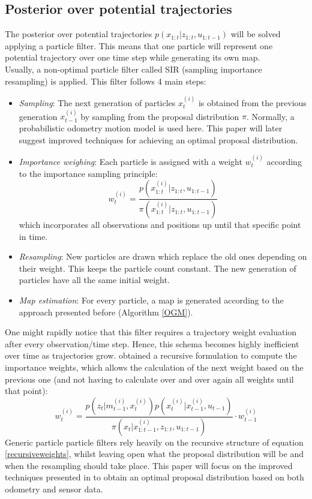 \documentclass[letterpaper]{article}
\begin{document}
\subsection{Posterior over potential trajectories}
The posterior over potential trajectories $p(x_{1:t}|z_{1:t}, u_{1:t-1})$ will be solved applying a particle filter. This means that one particle will represent one potential trajectory over one time step while generating its own map.\\
Usually, a non-optimal particle filter called SIR (sampling importance resampling) is applied. This filter follows 4 main steps:
\begin{itemize}
	\item \textit{Sampling}: The next generation of particles $x_t^{(i)}$ is obtained from the previous generation $x_{t-1}^{(i)}$ by sampling from the proposal distribution $\pi$. Normally, a probabilistic odometry motion model is used here. This paper will later suggest improved techniques for achieving an optimal proposal distribution.
	\item \textit{Importance weighing}: Each particle is assigned with a weight $w_t^{(i)}$ according to the importance sampling principle:
	\begin{equation}
		w_t^{(i)}=\frac{p(x_{1:t}^{(i)}|z_{1:t}, u_{1:t-1})}{\pi(x_{1:t}^{(i)}|z_{1:t}, u_{1:t-1})}
	\end{equation}
	which incorporates all observations and positions up until that specific point in time.
	\item \textit{Resampling}: New particles are drawn which replace the old ones depending on their weight. This keeps the particle count constant. The new generation of particles have all the same initial weight.
	\item \textit{Map estimation}: For every particle, a map is generated according to the approach presented before (Algorithm \ref{OGM}).
\end{itemize}
One might rapidly notice that this filter requires a trajectory weight evaluation after every observation/time step. Hence, this schema becomes highly inefficient over time as trajectories grow. \cite{Weights}  obtained a recursive formulation to compute the importance weights, which allows the calculation of the next weight based on the previous one (and not having to calculate over and over again all weights until that point):
\begin{equation}
\label{recursiveweights}
	w_t^{(i)}= \frac{p(z_t|m_{t-1}^{(i)}, x_t^{(i)})p(x_t^{(i)}|x_{t-1}^{(i)}, u_{t-1})}{\pi(x_t | x_{1:t-1}^{(i)}, z_{1:t},u_{1:t-1})} \cdot w_{t-1}^{(i)}
\end{equation}
Generic particle particle filters rely heavily on the recursive structure of equation \ref{recursiveweights}, whilst leaving open what the proposal distribution will be and when the resampling should take place. This paper will focus on the improved techniques presented in \cite{Cyrill} to obtain an optimal proposal distribution based on both odometry and sensor data.
\end{document}
